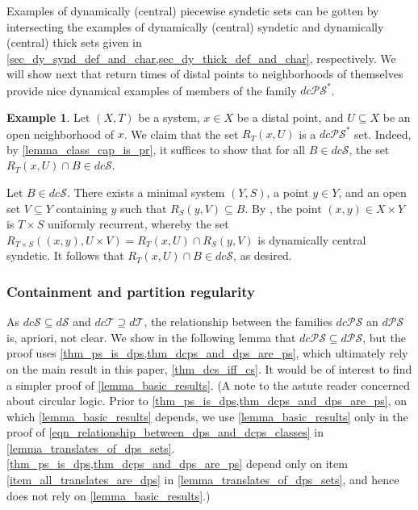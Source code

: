 \documentclass[letter,11pt]{article}
\theoremstyle{plain}
\theoremstyle{definition}
\newtheorem{example}[theorem]{Example}
\theoremstyle{plain}
\theoremstyle{plain}
\numberwithin{equation}{section}
\newcommand{\dsyndetic}{d\mathcal{S}}
\newcommand{\dthick}{d\mathcal{T}}
\newcommand{\dcsyndetic}{dc\mathcal{S}}
\newcommand{\dcthick}{dc\mathcal{T}}
\newcommand{\dPS}{d\mathcal{PS}}
\newcommand{\dcPS}{dc\mathcal{PS}}
\begin{document}
Examples of dynamically (central) piecewise syndetic sets can be gotten by intersecting the examples of dynamically (central) syndetic and dynamically (central) thick sets given in \cref{sec_dy_synd_def_and_char,sec_dy_thick_def_and_char}, respectively. We will show next that return times of distal points to neighborhoods of themselves provide nice dynamical examples of members of the family $\dcPS^*$.

\begin{example}
\label{example_dcps_star_point_returns}
    Let $(X, T) $ be a system, $x \in X$ be a distal point, and $U \subseteq X$ be an open neighborhood of $x$. We claim that the set $R_T(x,U)$ is a $\dcPS^*$ set.  Indeed, by \cref{lemma_class_cap_is_pr}, it suffices to show that for all $B \in \dcsyndetic$, the set $R_T(x,U) \cap B \in \dcsyndetic$.

    Let $B \in \dcsyndetic$.  There exists a minimal system $(Y,S)$, a point $y \in Y$, and an open set $V \subseteq Y$ containing $y$ such that $R_S(y,V) \subseteq B$.  By \cite[Thm. 9.11]{furstenberg_book_1981}, the point $(x,y) \in X \times Y$ is $T \times S$ uniformly recurrent, whereby the set $R_{T \times S}((x,y), U \times V) = R_T(x,U) \cap R_S(y,V)$ is dynamically central syndetic.  It follows that $R_T(x,U) \cap B \in \dcsyndetic$, as desired.
\end{example}



\subsubsection{Containment and partition regularity}

As $\dcsyndetic \subseteq \dsyndetic$ and $\dcthick \supseteq \dthick$, the relationship between the families $\dcPS$ an $\dPS$ is, apriori, not clear.  We show in the following lemma that $\dcPS \subseteq \dPS$, but the proof uses \cref{thm_ps_is_dps,thm_dcps_and_dps_are_ps}, which ultimately rely on the main result in this paper, \cref{thm_dcs_iff_cs}. It would be of interest to find a simpler proof of \cref{lemma_basic_results}. (A note to the astute reader concerned about circular logic.  Prior to \cref{thm_ps_is_dps,thm_dcps_and_dps_are_ps}, on which \cref{lemma_basic_results} depends, we use \cref{lemma_basic_results} only in the proof of \eqref{eqn_relationship_between_dps_and_dcps_classes} in \cref{lemma_translates_of_dps_sets}. \cref{thm_ps_is_dps,thm_dcps_and_dps_are_ps} depend only on item \eqref{item_all_translates_are_dps} in \cref{lemma_translates_of_dps_sets}, and hence does not rely on \cref{lemma_basic_results}.)
\end{document}
